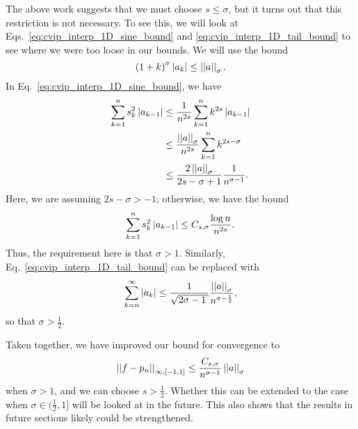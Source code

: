 The above work suggests that we must choose $s\le\sigma$, but
it turns out that this restriction is not necessary.
To see this, we will look at Eqs.~\eqref{eq:cvip_interp_1D_sine_bound}
and \eqref{eq:cvip_interp_1D_tail_bound} to see where we
were too loose in our bounds.
We will use the bound
%
\begin{equation}
    \left( 1+k \right)^{\sigma}\left| a_{k} \right| \le \left| \left| a \right| \right|_{\sigma}.
\end{equation}
%
In Eq.~\eqref{eq:cvip_interp_1D_sine_bound}, we have
%
\begin{align}
    \sum_{k=1}^{n}s_{k}^{2}\left| a_{k-1} \right| &\le
        \frac{1}{n^{2s}} \sum_{k=1}^{n}k^{2s}\left| a_{k-1} \right| \nonumber\\
    &\le \frac{\left| \left| a \right| \right|_{\sigma}}{n^{2s}}\sum_{k=1}^{n} k^{2s-\sigma}
        \nonumber\\
    &\le \frac{2\left| \left| a \right| \right|_{\sigma}}{2s-\sigma+1}\frac{1}{n^{\sigma-1}}.
\end{align}
%
Here, we are assuming $2s-\sigma>-1$; otherwise, we have the bound
\begin{equation}
    \sum_{k=1}^{n}s_{k}^{2}\left| a_{k-1} \right| \le C_{s,\sigma}\frac{\log n}{n^{2s}}.
\end{equation}
%
Thus, the requirement here is that $\sigma>1$.
Similarly, Eq.~\eqref{eq:cvip_interp_1D_tail_bound} can be replaced with
%
\begin{equation}
    \sum_{k=n}^{\infty}\abs{a_{k}}
        \le \frac{1}{\sqrt{2\sigma-1}}\frac{\norm{a}_{\sigma}}{
        n^{\sigma-\frac{1}{2}}},
\end{equation}
%
so that $\sigma>\frac{1}{2}$.

Taken together, we have improved our bound for convergence to
%
\begin{equation}
    \left| \left| f-p_{n} \right| \right|_{\infty,[-1,1]}
        \le \frac{C_{s,\sigma}}{n^{\sigma-1}}\left| \left| a \right| \right|_{\sigma}
\end{equation}
%
when $\sigma>1$, and we can choose $s>\frac{1}{2}$.
Whether this can be extended to the case when $\sigma\in(\frac{1}{2},1]$
will be looked at in the future.
This also shows that the results in future sections likely
could be strengthened.



